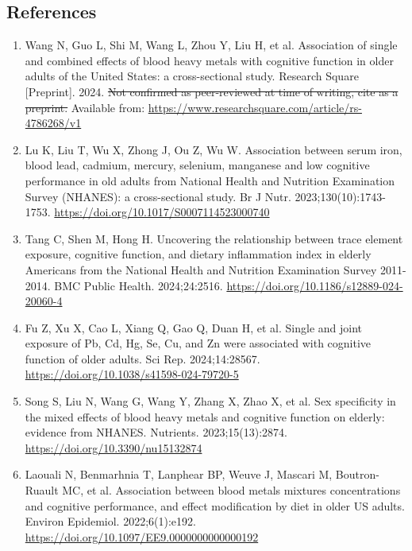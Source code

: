 \documentclass[12pt]{article}
\providecommand{\DIFdeltex}[1]{{\protect\color{red}\sout{#1}}} %
\providecommand{\DIFdelbegin}{} %
\providecommand{\DIFdelend}{} %
\providecommand{\DIFdel}[1]{\texorpdfstring{\DIFdeltex{#1}}{}} %
\providecommand{\DIFscaledelfig}{0.5}
\newlength{\DIFdelgraphicswidth} %
\newlength{\DIFdelgraphicsheight} %
\providecommand{\DIFdelincludegraphics}[2][]{%
\sbox{\DIFdelgraphicsbox}{\DIFOincludegraphics[#1]{#2}}%
\settoboxwidth{\DIFdelgraphicswidth}{\DIFdelgraphicsbox} %
\settoboxtotalheight{\DIFdelgraphicsheight}{\DIFdelgraphicsbox} %
\scalebox{\DIFscaledelfig}{%
\parbox[b]{\DIFdelgraphicswidth}{\usebox{\DIFdelgraphicsbox}\\[-\baselineskip] \rule{\DIFdelgraphicswidth}{0em}}\llap{\resizebox{\DIFdelgraphicswidth}{\DIFdelgraphicsheight}{%
\setlength{\unitlength}{\DIFdelgraphicswidth}%
\begin{picture}(1,1)%
\thicklines\linethickness{2pt} %
{\color[rgb]{1,0,0}\put(0,0){\framebox(1,1){}}}%
{\color[rgb]{1,0,0}\put(0,0){\line( 1,1){1}}}%
{\color[rgb]{1,0,0}\put(0,1){\line(1,-1){1}}}%
\end{picture}%
}\hspace*{3pt}}} %
} %
\DeclareRobustCommand{\DIFdelbegin}{\DIFOdelbegin \let\includegraphics\DIFdelincludegraphics} %
\DeclareRobustCommand{\DIFdelend}{\DIFOaddend \let\includegraphics\DIFOincludegraphics} %
\begin{document}
\clearpage
\begin{singlespace}
\section*{References}

\begin{enumerate}
\item Wang N, Guo L, Shi M, Wang L, Zhou Y, Liu H, et al. Association of single and combined effects of blood heavy metals with cognitive function in older adults of the United States: a cross-sectional study. Research Square [Preprint]. 2024. \DIFdelbegin \DIFdel{Not confirmed as peer-reviewed at time of writing, cite as a preprint. }\DIFdelend Available from: \url{https://www.researchsquare.com/article/rs-4786268/v1}

\item Lu K, Liu T, Wu X, Zhong J, Ou Z, Wu W. Association between serum iron, blood lead, cadmium, mercury, selenium, manganese and low cognitive performance in old adults from National Health and Nutrition Examination Survey (NHANES): a cross-sectional study. Br J Nutr. 2023;130(10):1743-1753. \url{https://doi.org/10.1017/S0007114523000740}

\item Tang C, Shen M, Hong H. Uncovering the relationship between trace element exposure, cognitive function, and dietary inflammation index in elderly Americans from the National Health and Nutrition Examination Survey 2011-2014. BMC Public Health. 2024;24:2516. \url{https://doi.org/10.1186/s12889-024-20060-4}

\item Fu Z, Xu X, Cao L, Xiang Q, Gao Q, Duan H, et al. Single and joint exposure of Pb, Cd, Hg, Se, Cu, and Zn were associated with cognitive function of older adults. Sci Rep. 2024;14:28567. \url{https://doi.org/10.1038/s41598-024-79720-5}

\item Song S, Liu N, Wang G, Wang Y, Zhang X, Zhao X, et al. Sex specificity in the mixed effects of blood heavy metals and cognitive function on elderly: evidence from NHANES. Nutrients. 2023;15(13):2874. \url{https://doi.org/10.3390/nu15132874}

\item Laouali N, Benmarhnia T, Lanphear BP, Weuve J, Mascari M, Boutron-Ruault MC, et al. Association between blood metals mixtures concentrations and cognitive performance, and effect modification by diet in older US adults. Environ Epidemiol. 2022;6(1):e192. \url{https://doi.org/10.1097/EE9.0000000000000192}


\end{enumerate}
\end{singlespace}
\end{document}
